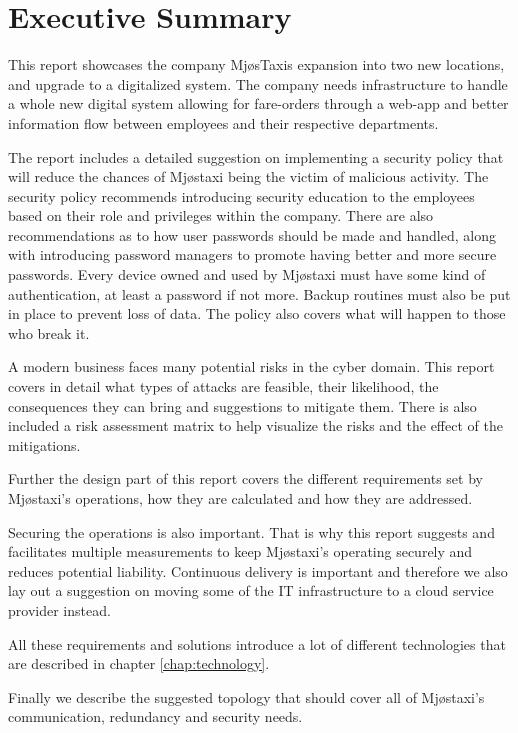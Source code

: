 \section*{Executive Summary}
\label{chap:exSummary}

This report showcases the company MjøsTaxis expansion into two new locations, and upgrade to a digitalized system.
The company needs infrastructure to handle a whole new digital system allowing for fare-orders through a web-app and better information flow between employees and their respective departments.

The report includes a detailed suggestion on implementing a security policy that will reduce the chances of Mjøstaxi being the victim of malicious activity.
The security policy recommends introducing security education to the employees based on their role and privileges within the company.
There are also recommendations as to how user passwords should be made and handled, along with introducing password managers to promote having better and more secure passwords.
Every device owned and used by Mjøstaxi must have some kind of authentication, at least a password if not more.
Backup routines must also be put in place to prevent loss of data.
The policy also covers what will happen to those who break it.

A modern business faces many potential risks in the cyber domain.
This report covers in detail what types of attacks are feasible, their likelihood, the consequences they can bring and suggestions to mitigate them.
There is also included a risk assessment matrix to help visualize the risks and the effect of the mitigations.

Further the design part of this report covers the different requirements set by Mjøstaxi's operations, how they are calculated and how they are addressed.

Securing the operations is also important. 
That is why this report suggests and facilitates multiple measurements to keep Mjøstaxi's operating securely and reduces potential liability.
Continuous delivery is important and therefore we also lay out a suggestion on moving some of the IT infrastructure to a cloud service provider instead.

All these requirements and solutions introduce a lot of different technologies that are described in chapter \ref{chap:technology}.

Finally we describe the suggested topology that should cover all of Mjøstaxi's communication, redundancy and security needs. 



